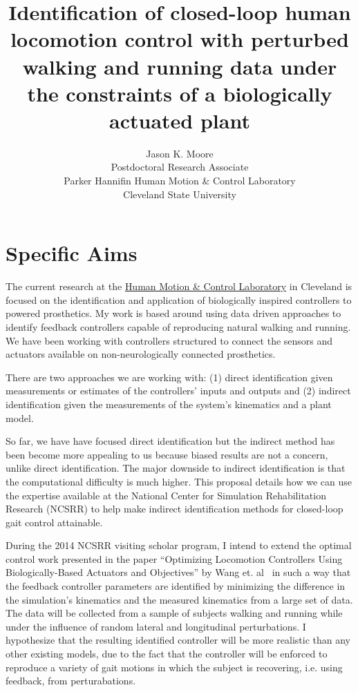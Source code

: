 \documentclass[11pt]{article}
\title{Identification of closed-loop human locomotion control with perturbed
walking and running data under the constraints of a biologically actuated
plant}
\author{Jason K. Moore\\
  Postdoctoral Research Associate\\
  Parker Hannifin Human Motion \& Control Laboratory\\
  Cleveland State University
}
\begin{document}
\maketitle

\section*{Specific Aims}

The current research at the \href{http://hmc.csuohio.edu}{Human Motion \&
Control Laboratory} in Cleveland is focused on the identification and
application of biologically inspired controllers to powered prosthetics. My
work is based around using data driven approaches to identify feedback
controllers capable of reproducing natural walking and running. We have been
working with controllers structured to connect the sensors and actuators
available on non-neurologically connected prosthetics.

There are two approaches we are working with: (1) direct identification given
measurements or estimates of the controllers' inputs and outputs and (2)
indirect identification given the measurements of the system's kinematics and a
plant model.

So far, we have have focused direct identification but the indirect method has
been become more appealing to us because biased results are not a concern,
unlike direct identification. The major downside to indirect identification is
that the computational difficulty is much higher. This proposal details how we
can use the expertise available at the National Center for Simulation
Rehabilitation Research (NCSRR) to help make indirect identification methods
for closed-loop gait control attainable.

During the 2014 NCSRR visiting scholar program, I intend to extend the optimal
control work presented in the paper ``Optimizing Locomotion Controllers Using
Biologically-Based Actuators and Objectives'' by Wang et. al~\cite{Wang2012} in
such a way that the feedback controller parameters are identified by minimizing the
difference in the simulation's kinematics and the measured kinematics from a
large set of data. The data will be collected from a sample of subjects walking
and running while under the influence of random lateral and longitudinal
perturbations. I hypothesize that the resulting identified controller will be
more realistic than any other existing models, due to the fact that the
controller will be enforced to reproduce a variety of gait motions in which the
subject is recovering, i.e. using feedback, from perturabations.
\end{document}
